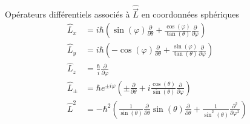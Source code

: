         \begin{omed}{Opérateurs différentiels associés à $\hat{\vec{L}}$ en coordonnées sphériques}
            \begin{align*}
                \hat{L}_x &= i \hbar \left(\sin(\varphi) \frac{\partial }{\partial \theta} + \frac{\cos(\varphi)}{\tan(\theta)} \frac{\partial }{\partial \varphi} \right) \\
                \hat{L}_y &= i \hbar \left(-\cos(\varphi) \frac{\partial }{\partial \theta} + \frac{\sin(\varphi)}{\tan(\theta)} \frac{\partial }{\partial \varphi} \right) \\
                \hat{L}_z &= \frac{\hbar}{i} \frac{\partial }{\partial \varphi} \\
                \hat{L}_{\pm} &= \hbar e^{\pm i \varphi} \left(\pm \frac{\partial }{\partial \theta} + i \frac{\cos(\theta)}{\sin(\theta)} \frac{\partial }{\partial \varphi} \right) \\
                \hat{L}^2 &= - \hbar^2 \left(\frac{1}{\sin(\theta)}\frac{\partial }{\partial \theta} \sin(\theta) \frac{\partial }{\partial \theta}  + \frac{1}{\sin^2(\theta)}\frac{\partial^2}{\partial \varphi^2} \right)
            \end{align*}
        \end{omed}

